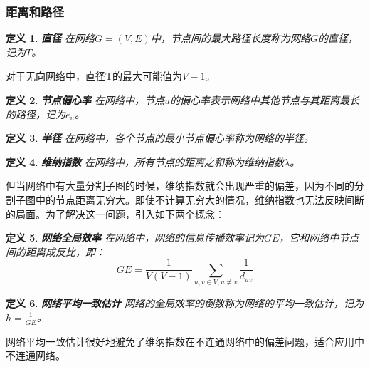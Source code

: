 \documentclass{ctexart}
\newtheorem{Definition}{\hspace{2em}定义}[section]
\begin{document}
            \subsubsection{距离和路径}
                \begin{Definition}
                    \textbf{直径} 在网络$G=(V,E)$中，节点间的最大路径长度称为网络$G$的直径，记为$T$。
                \end{Definition}
                对于无向网络中，直径T的最大可能值为$V-1$。
                \begin{Definition}
                    \textbf{节点偏心率} 在网络中，节点$u$的偏心率表示网络中其他节点与其距离最长的路径，记为$e_u$。
                \end{Definition}
                \begin{Definition}
                    \textbf{半径} 在网络中，各个节点的最小节点偏心率称为网络的半径。
                \end{Definition}

                \begin{Definition}
                    \textbf{维纳指数} 在网络中，所有节点的距离之和称为维纳指数$\lambda$。
                \end{Definition}
                但当网络中有大量分割子图的时候，维纳指数就会出现严重的偏差，因为不同的分割子图中的节点距离无穷大。即使不计算无穷大的情况，维纳指数也无法反映间断的局面。为了解决这一问题，引入如下两个概念：
                \begin{Definition}
                    \textbf{网络全局效率} 在网络中，网络的信息传播效率记为$GE$，它和网络中节点间的距离成反比，即：
                    $$
                        GE = \frac{1}{V(V-1)}\sum_{u,v\in V,u\ne v} \frac{1}{d_{uv}}
                    $$
                \end{Definition}
                \begin{Definition}
                    \textbf{网络平均一致估计} 网络的全局效率的倒数称为网络的平均一致估计，记为$h=\frac{1}{GE}$。
                \end{Definition}
                网络平均一致估计很好地避免了维纳指数在不连通网络中的偏差问题，适合应用中不连通网络。
\end{document}
